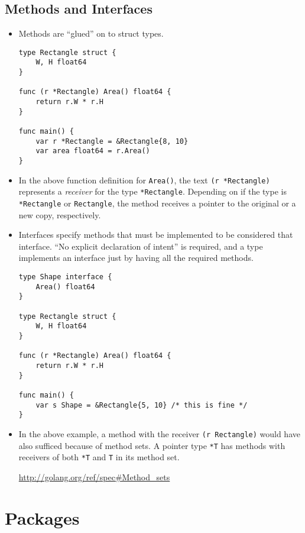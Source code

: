 \documentclass[12pt]{article}
\begin{document}
\subsection{Methods and Interfaces}
\begin{itemize}
    \item Methods are ``glued'' on to struct types.
        \begin{verbatim}
type Rectangle struct {
    W, H float64
}

func (r *Rectangle) Area() float64 {
    return r.W * r.H
}

func main() {
    var r *Rectangle = &Rectangle{8, 10}
    var area float64 = r.Area()
}
        \end{verbatim}
    \item In the above function definition for \texttt{Area()}, the text
          \texttt{(r *Rectangle)} represents a \textit{receiver} for the
          type \texttt{*Rectangle}. Depending on if the type is
          \texttt{*Rectangle} or \texttt{Rectangle}, the 
          method receives a pointer to the original or a new copy,
          respectively. 
    \item Interfaces specify methods that must be implemented to be
          considered that interface. ``No explicit declaration of
          intent'' is required, and a type implements an interface
          just by having all the required methods.
        \begin{verbatim}
type Shape interface {
    Area() float64
}

type Rectangle struct {
    W, H float64
}

func (r *Rectangle) Area() float64 {
    return r.W * r.H
}

func main() {
    var s Shape = &Rectangle{5, 10} /* this is fine */
}
        \end{verbatim}
    \item In the above example, a method with the receiver
        \texttt{(r Rectangle)} would have also sufficed because of
        method sets. A pointer type \texttt{*T} has methods with
        receivers of both \texttt{*T} and \texttt{T} in its method
        set. 
        
        \url{http://golang.org/ref/spec#Method_sets}
\end{itemize}

\section{Packages}
\end{document}
